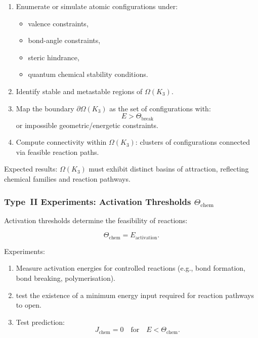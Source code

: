 \begin{enumerate}
    \item Enumerate or simulate atomic configurations under:
          \begin{itemize}
              \item valence constraints,
              \item bond-angle constraints,
              \item steric hindrance,
              \item quantum chemical stability conditions.
          \end{itemize}

    \item Identify stable and metastable regions of $\Omega(K_3)$.

    \item Map the boundary $\partial\Omega(K_3)$ as the set of configurations
          with:
          \[
              E > \Theta_{\mathrm{break}}
          \]
          or impossible geometric/energetic constraints.

    \item Compute connectivity within $\Omega(K_3)$:
          clusters of configurations connected via feasible reaction paths.
\end{enumerate}

Expected results:
$\Omega(K_3)$ must exhibit distinct basins of attraction, reflecting
chemical families and reaction pathways.



\subsubsection{Type~II Experiments: Activation Thresholds $\Theta_{\mathrm{chem}}$}

Activation thresholds determine the feasibility of reactions:

\[
   \Theta_{\mathrm{chem}} = E_{\mathrm{activation}}.
\]

Experiments:

\begin{enumerate}
    \item Measure activation energies for controlled reactions (e.g.,
          bond formation, bond breaking, polymerisation).

    \item test the existence of a minimum energy input
          required for reaction pathways to open.

    \item Test prediction:
          \[
             J_{\mathrm{chem}} = 0
             \quad \text{for} \quad
             E < \Theta_{\mathrm{chem}}.
          \]
\end{enumerate}

